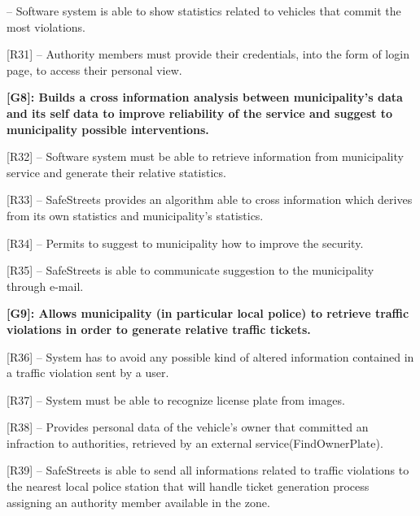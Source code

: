 \documentclass[12pt]{article}
\begin{document}
\begin{flushleft}
[R30] – Software system is able to show statistics related to vehicles that commit the most violations.
\vspace{2mm}

[R31] – Authority members must provide their credentials, into the form of login page, to access their personal view.
\vspace{2mm}

\vspace{4mm}
\textbf{ [G8]: Builds a cross information analysis between municipality’s data and its self data to improve reliability of the service and suggest to municipality possible interventions.}
\vspace{2mm}

[R32] -- Software system must be able to retrieve information from municipality service and generate their relative statistics.
\vspace{2mm}

[R33] – SafeStreets provides an algorithm able to cross information which derives from its own statistics and municipality’s statistics.
\vspace{2mm}

[R34] – Permits to suggest to municipality how to improve the security.
\vspace{2mm}

[R35] –  SafeStreets is able to communicate suggestion to the municipality through e-mail.
\vspace{2mm}

\vspace{4mm}
\textbf{ [G9]: Allows municipality (in particular local police) to retrieve traffic violations in order to generate relative traffic tickets.}
\vspace{2mm}

[R36] -- System has to avoid any possible kind of altered information contained in a traffic violation sent by a user.
\vspace{2mm}

[R37] – System must be able to recognize license plate from images.
\vspace{2mm}

[R38] – Provides personal data of the vehicle’s owner that committed an infraction to authorities, retrieved by an external service(FindOwnerPlate).
\vspace{2mm}

[R39] – SafeStreets is able to send all informations related to traffic violations to the nearest local police station that will handle ticket generation process assigning an authority member available in the zone.
\vspace{2mm}


\end{flushleft}
\end{document}
